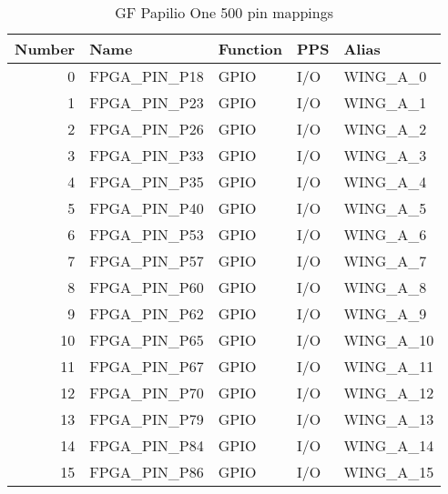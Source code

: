 \begin{table}[H]
\begin{center}
\begin{tabularx}{14cm}{rlllX}
Number & Name & Function & PPS & Alias \\
\hline

0 & FPGA\_PIN\_P18 & GPIO & I/O & WING\_A\_0 \\
1 & FPGA\_PIN\_P23 & GPIO & I/O & WING\_A\_1 \\
2 & FPGA\_PIN\_P26  & GPIO & I/O & WING\_A\_2 \\
3 & FPGA\_PIN\_P33  & GPIO & I/O & WING\_A\_3 \\
4 & FPGA\_PIN\_P35  & GPIO & I/O & WING\_A\_4 \\
5 & FPGA\_PIN\_P40  & GPIO & I/O & WING\_A\_5 \\
6 & FPGA\_PIN\_P53  & GPIO & I/O & WING\_A\_6 \\
7 & FPGA\_PIN\_P57  & GPIO & I/O & WING\_A\_7 \\
8 & FPGA\_PIN\_P60  & GPIO & I/O & WING\_A\_8 \\
9 & FPGA\_PIN\_P62  & GPIO & I/O & WING\_A\_9 \\
10 & FPGA\_PIN\_P65 & GPIO & I/O & WING\_A\_10 \\
11 & FPGA\_PIN\_P67 & GPIO & I/O & WING\_A\_11 \\
12 & FPGA\_PIN\_P70 & GPIO & I/O & WING\_A\_12 \\
13 & FPGA\_PIN\_P79 & GPIO & I/O & WING\_A\_13 \\
14 & FPGA\_PIN\_P84 & GPIO & I/O & WING\_A\_14 \\
15 & FPGA\_PIN\_P86 & GPIO & I/O & WING\_A\_15
\end{tabularx}
\caption{GF Papilio One 500 pin mappings}
\end{center}
\end{table}

